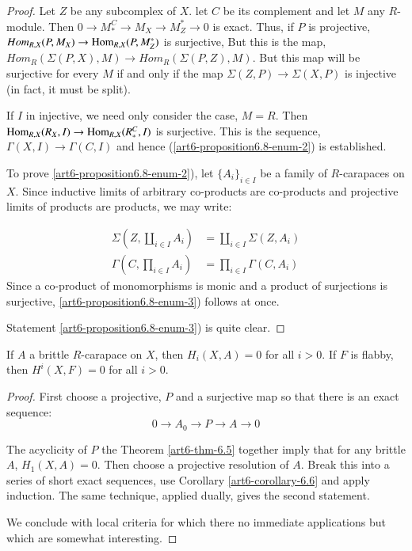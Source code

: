 \begin{proof}
Let $Z$ be any subcomplex of $X$. let $C$ be its complement and let $M$ any $R$-module. Then $0 \rightarrow M_{*}^{C} \rightarrow M_{X} \rightarrow M_{Z}^{*} \rightarrow 0$ is exact. Thus, if $P$ is projective, $Hom_{R,X}(P, M_{X}) \rightarrow \operatorname{Hom}_{R, X}(P, M_{Z}^{*})$ is surjective, But this is the map, $Hom_{R}(\Sigma(P, X), M) \rightarrow Hom_{R}(\Sigma(P, Z), M)$. But this map will be surjective for every $M$ if and only if the map $\Sigma(Z, P) \rightarrow \Sigma(X, P)$ is injective (in fact, it must be split).

If $I$ in injective, we need only consider the case, $M =R$. Then $\operatorname{Hom}_{R, X}(R_{X}, I) \rightarrow \operatorname{Hom}_{R, X}(R_{*}^{C}, I)$ is surjective. This is the sequence,  $\Gamma (X, I) \rightarrow \Gamma(C, I)$ and hence
(\ref{art6-proposition6.8-enum-2}) is established.

To prove \ref{art6-proposition6.8-enum-2}), let $\{A_{i}\}_{i \in I}$ be a family of $R$-carapaces on $X$. Since inductive limits of arbitrary co-products are co-products and projective limits of products are products, we may write:

\begin{equation}
\begin{aligned}\label{art6-eq-6.9}
\Sigma \left(Z, \coprod_{i \in I} A_{i}\right) &= \coprod_{i \in I} \Sigma (Z, A_{i})\\
\Gamma \left(C, \prod_{i \in I}A_{i}\right) &= \prod_{i \in I}\Gamma (C, A_{i})
\end{aligned}
\end{equation}
Since a co-product of monomorphisms is monic and a product of surjections is surjective,
\ref{art6-proposition6.8-enum-3}) follows at once.

Statement \ref{art6-proposition6.8-enum-3}) is quite clear.
\end{proof}


\begin{prop}\label{art6-proposition-6.10}
If $A$ a brittle $R$-carapace on $X$, then $H_{i}(X, A) = 0$ for all $i > 0$. If $F$ is flabby, then $H^{i}(X, F) = 0$ for all $i > 0$.
\end{prop}

\begin{proof}
First choose a projective, $P$ and a surjective map so that there is an exact sequence:
$$
0 \rightarrow A_{0} \rightarrow P \rightarrow A \rightarrow 0
$$

The acyclicity of $P$ the Theorem \ref{art6-thm-6.5} together imply that for any brittle $A$, $H_{1}(X, A) = 0$. Then choose a projective resolution of $A$. Break this into a series of short exact sequences, use Corollary
\ref{art6-corollary-6.6} and apply induction. The same technique, applied dually, gives the second statement.

We conclude with local criteria for which there no immediate applications but which are somewhat interesting.
\end{proof}

